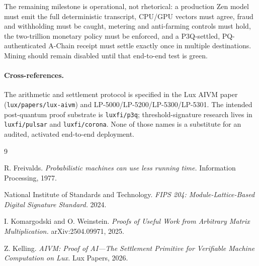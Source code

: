 The remaining milestone is operational, not rhetorical: a production Zen model
must emit the full deterministic transcript, CPU/GPU vectors must agree, fraud
and withholding must be caught, metering and anti-farming controls must hold,
the two-trillion monetary policy must be enforced, and a P3Q-settled,
PQ-authenticated A-Chain receipt must settle exactly once in multiple
destinations. Mining should remain disabled until that end-to-end test is green.

\paragraph{Cross-references.}
The arithmetic and settlement protocol is specified in the Lux AIVM paper
(\texttt{lux/papers/lux-aivm}) and LP-5000/LP-5200/LP-5300/LP-5301. The intended
post-quantum proof substrate is \texttt{luxfi/p3q}; threshold-signature research
lives in \texttt{luxfi/pulsar} and \texttt{luxfi/corona}. None of those names is
a substitute for an audited, activated end-to-end deployment.

\begin{thebibliography}{9}

R. Freivalds.
\textit{Probabilistic machines can use less running time.}
Information Processing, 1977.

National Institute of Standards and Technology.
\textit{FIPS 204: Module-Lattice-Based Digital Signature Standard.}
2024.

I. Komargodski and O. Weinstein.
\textit{Proofs of Useful Work from Arbitrary Matrix Multiplication.}
arXiv:2504.09971, 2025.

Z. Kelling.
\textit{AIVM: Proof of AI---The Settlement Primitive for Verifiable Machine
Computation on Lux.}
Lux Papers, 2026.

\end{thebibliography}
